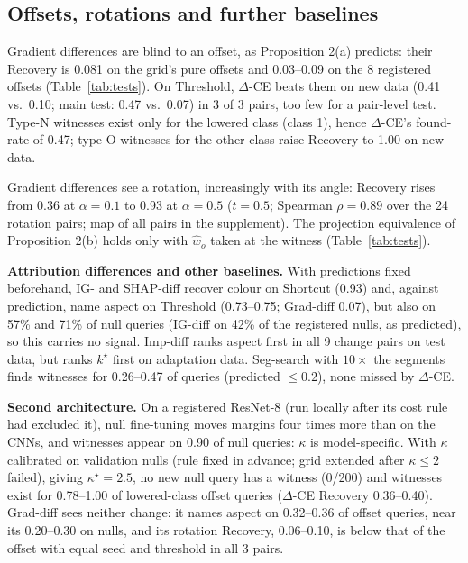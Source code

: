 \documentclass{esannV2}
\begin{document}
\subsection{Offsets, rotations and further baselines}

Gradient differences are blind to an offset, as Proposition 2(a) predicts: their Recovery is 0.081 on the grid's pure offsets and 0.03--0.09 on the 8 registered offsets (Table~\ref{tab:tests}). On Threshold, $\Delta$-CE beats them on new data (0.41 vs.\ 0.10; main test: 0.47 vs.\ 0.07) in 3 of 3 pairs, too few for a pair-level test. Type-N witnesses exist only for the lowered class (class 1), hence $\Delta$-CE's found-rate of 0.47; type-O witnesses for the other class raise Recovery to 1.00 on new data.


Gradient differences see a rotation, increasingly with its angle: Recovery rises from 0.36 at $\alpha=0.1$ to 0.93 at $\alpha=0.5$ ($t=0.5$; Spearman $\rho=0.89$ over the 24 rotation pairs; map of all pairs in the supplement). The projection equivalence of Proposition 2(b) holds only with $\hat w_o$ taken at the witness (Table~\ref{tab:tests}).

\textbf{Attribution differences and other baselines.} With predictions fixed beforehand, IG- and SHAP-diff recover colour on Shortcut (0.93) and, against prediction, name aspect on Threshold (0.73--0.75; Grad-diff 0.07), but also on 57\% and 71\% of null queries (IG-diff on 42\% of the registered nulls, as predicted), so this carries no signal. Imp-diff ranks aspect first in all 9 change pairs on test data, but ranks $k^\star$ first on adaptation data. Seg-search with $10\times$ the segments finds witnesses for 0.26--0.47 of queries (predicted $\le0.2$), none missed by $\Delta$-CE.

\textbf{Second architecture.} On a registered ResNet-8 (run locally after its cost rule had excluded it), null fine-tuning moves margins four times more than on the CNNs, and witnesses appear on 0.90 of null queries: $\kappa$ is model-specific. With $\kappa$ calibrated on validation nulls (rule fixed in advance; grid extended after $\kappa\le2$ failed), giving $\kappa^\star=2.5$, no new null query has a witness (0/200) and witnesses exist for 0.78--1.00 of lowered-class offset queries ($\Delta$-CE Recovery 0.36--0.40). Grad-diff sees neither change: it names aspect on 0.32--0.36 of offset queries, near its 0.20--0.30 on nulls, and its rotation Recovery, 0.06--0.10, is below that of the offset with equal seed and threshold in all 3 pairs.
\end{document}
